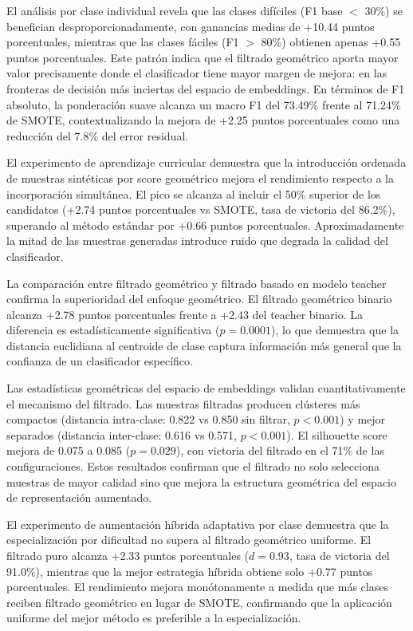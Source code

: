 El análisis por clase individual revela que las clases difíciles (F1 base $<$ 30\%) se benefician desproporcionadamente, con ganancias medias de +10.44 puntos porcentuales, mientras que las clases fáciles (F1 $>$ 80\%) obtienen apenas +0.55 puntos porcentuales. Este patrón indica que el filtrado geométrico aporta mayor valor precisamente donde el clasificador tiene mayor margen de mejora: en las fronteras de decisión más inciertas del espacio de embeddings. En términos de F1 absoluto, la ponderación suave alcanza un macro F1 del 73.49\% frente al 71.24\% de SMOTE, contextualizando la mejora de +2.25 puntos porcentuales como una reducción del 7.8\% del error residual.

El experimento de aprendizaje curricular demuestra que la introducción ordenada de muestras sintéticas por score geométrico mejora el rendimiento respecto a la incorporación simultánea. El pico se alcanza al incluir el 50\% superior de los candidatos (+2.74 puntos porcentuales vs SMOTE, tasa de victoria del 86.2\%), superando al método estándar por +0.66 puntos porcentuales. Aproximadamente la mitad de las muestras generadas introduce ruido que degrada la calidad del clasificador.

La comparación entre filtrado geométrico y filtrado basado en modelo teacher confirma la superioridad del enfoque geométrico. El filtrado geométrico binario alcanza +2.78 puntos porcentuales frente a +2.43 del teacher binario. La diferencia es estadísticamente significativa ($p = 0.0001$), lo que demuestra que la distancia euclidiana al centroide de clase captura información más general que la confianza de un clasificador específico.

Las estadísticas geométricas del espacio de embeddings validan cuantitativamente el mecanismo del filtrado. Las muestras filtradas producen clústeres más compactos (distancia intra-clase: 0.822 vs 0.850 sin filtrar, $p < 0.001$) y mejor separados (distancia inter-clase: 0.616 vs 0.571, $p < 0.001$). El silhouette score mejora de 0.075 a 0.085 ($p = 0.029$), con victoria del filtrado en el 71\% de las configuraciones. Estos resultados confirman que el filtrado no solo selecciona muestras de mayor calidad sino que mejora la estructura geométrica del espacio de representación aumentado.

El experimento de aumentación híbrida adaptativa por clase demuestra que la especialización por dificultad no supera al filtrado geométrico uniforme. El filtrado puro alcanza +2.33 puntos porcentuales ($d = 0.93$, tasa de victoria del 91.0\%), mientras que la mejor estrategia híbrida obtiene solo +0.77 puntos porcentuales. El rendimiento mejora monótonamente a medida que más clases reciben filtrado geométrico en lugar de SMOTE, confirmando que la aplicación uniforme del mejor método es preferible a la especialización.

